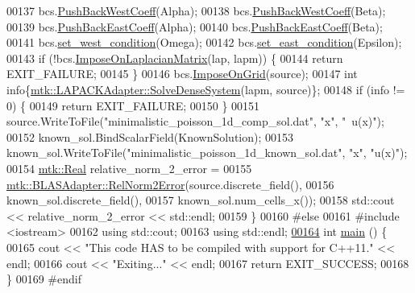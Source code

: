 \begin{DoxyCode}
00137   bcs.\hyperlink{classmtk_1_1RobinBCDescriptor1D_acdf8a75f8c39b3b8a032af81e0fd2e89}{PushBackWestCoeff}(Alpha);
00138   bcs.\hyperlink{classmtk_1_1RobinBCDescriptor1D_acdf8a75f8c39b3b8a032af81e0fd2e89}{PushBackWestCoeff}(Beta);
00139   bcs.\hyperlink{classmtk_1_1RobinBCDescriptor1D_a7791c11e0950656cb5608a77918c28d4}{PushBackEastCoeff}(Alpha);
00140   bcs.\hyperlink{classmtk_1_1RobinBCDescriptor1D_a7791c11e0950656cb5608a77918c28d4}{PushBackEastCoeff}(Beta);
00141   bcs.\hyperlink{classmtk_1_1RobinBCDescriptor1D_a06bfaf0126d528247c3c76fdd19f4b85}{set\_west\_condition}(Omega);
00142   bcs.\hyperlink{classmtk_1_1RobinBCDescriptor1D_a4edc92eeaaaa3f1e7f2cedfea3d35681}{set\_east\_condition}(Epsilon);
00143   \textcolor{keywordflow}{if} (!bcs.\hyperlink{classmtk_1_1RobinBCDescriptor1D_ab8446428df923c27f388a85bd3f2c6d4}{ImposeOnLaplacianMatrix}(lap, lapm)) \{
00144     \textcolor{keywordflow}{return} EXIT\_FAILURE;
00145   \}
00146   bcs.\hyperlink{classmtk_1_1RobinBCDescriptor1D_ab0daec1d6c5c9c6768bea08281a3831d}{ImposeOnGrid}(source);
00147   \textcolor{keywordtype}{int} info\{\hyperlink{classmtk_1_1LAPACKAdapter_a7428bccf74fd4a4af68fb7233846da22}{mtk::LAPACKAdapter::SolveDenseSystem}(lapm, source)\};
00148   \textcolor{keywordflow}{if} (info != 0) \{
00149     \textcolor{keywordflow}{return} EXIT\_FAILURE;
00150   \}
00151   source.WriteToFile(\textcolor{stringliteral}{"minimalistic\_poisson\_1d\_comp\_sol.dat"}, \textcolor{stringliteral}{"x"}, \textcolor{stringliteral}{"~u(x)"});
00152   known\_sol.BindScalarField(KnownSolution);
00153   known\_sol.WriteToFile(\textcolor{stringliteral}{"minimalistic\_poisson\_1d\_known\_sol.dat"}, \textcolor{stringliteral}{"x"}, \textcolor{stringliteral}{"u(x)"});
00154   \hyperlink{group__c01-roots_gac080bbbf5cbb5502c9f00405f894857d}{mtk::Real} relative\_norm\_2\_error =
00155     \hyperlink{classmtk_1_1BLASAdapter_af2ac5691f45e67d6e26186b071119ec4}{mtk::BLASAdapter::RelNorm2Error}(source.discrete\_field(),
00156                                     known\_sol.discrete\_field(),
00157                                     known\_sol.num\_cells\_x());
00158   std::cout << relative\_norm\_2\_error << std::endl;
00159 \}
00160 \textcolor{preprocessor}{#else}
00161 \textcolor{preprocessor}{#include <iostream>}
00162 \textcolor{keyword}{using} std::cout;
00163 \textcolor{keyword}{using} std::endl;
\hypertarget{minimalistic__poisson__1d_8cc_source_l00164}{}\hyperlink{minimalistic__poisson__1d_8cc_ae66f6b31b5ad750f1fe042a706a4e3d4}{00164} \textcolor{keywordtype}{int} \hyperlink{minimalistic__poisson__1d_8cc_ae66f6b31b5ad750f1fe042a706a4e3d4}{main} () \{
00165   cout << \textcolor{stringliteral}{"This code HAS to be compiled with support for C++11."} << endl;
00166   cout << \textcolor{stringliteral}{"Exiting..."} << endl;
00167   \textcolor{keywordflow}{return} EXIT\_SUCCESS;
00168 \}
00169 \textcolor{preprocessor}{#endif}
\end{DoxyCode}
